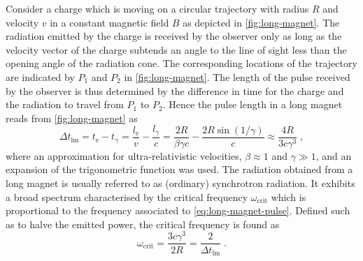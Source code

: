 \documentclass[
twoside,
openright,
titlepage,
numbers=noenddot,
headinclude,
fleqn,
a4paper,
footinclude=true,
cleardoublepage=empty,
abstractoff,
BCOR=5mm,
paper=a4,
fontsize=11pt,
british,ngerman,american,
]{scrreprt}
\begin{document}
Consider a charge which is moving on a circular trajectory with radius
$R$ and velocity $v$ in a constant magnetic field $B$ as depicted in
\cref{fig:long-magnet}.  The radiation emitted by the charge is
received by the observer only as long as the velocity vector of the
charge subtends an angle to the line of sight less than the opening
angle of the radiation cone.  The corresponding locations of the
trajectory are indicated by $P_1$ and $P_2$ in \cref{fig:long-magnet}.
The length of the pulse received by the observer is thus determined by
the difference in time for the charge and the radiation to travel from
$P_1$ to $P_2$.  Hence the pulse length in a long magnet reads from
\cref{fig:long-magnet} as
\begin{equation}
  \label{eq:long-magnet-pulse}
  \Delta t_{\mathrm{lm}} 
  = t_\mathrm{e}-t_\gamma 
  = \frac{l_\mathrm{e}}{v} - \frac{l_\gamma}{c}
  = \frac{2R}{\beta\gamma c}-\frac{2R\sin(1/\gamma)}{c}
  \approx \frac{4R}{3c\gamma^3}\;,
\end{equation}
where an approximation for ultra-relativistic velocities,
$\beta\approx 1$ and $\gamma\gg1$, and an expansion of the
trigonometric function was used.  The radiation obtained from a long
magnet is usually referred to as (ordinary) synchrotron radiation.  It
exhibits a broad spectrum characterised by the critical frequency
$\omega_{\mathrm{crit}}$ which is proportional to the frequency
associated to \cref{eq:long-magnet-pulse}.  Defined such as to halve
the emitted power, the critical frequency is found as
\cite{Hofmann2004Book}
\begin{equation}
  \label{eq:omega-critical}
  \omega_{\mathrm{crit}}=\frac{3 c\gamma^3}{2R}
  = \frac{2}{\Delta t_{\mathrm{lm}}}\;.
\end{equation}
\end{document}
